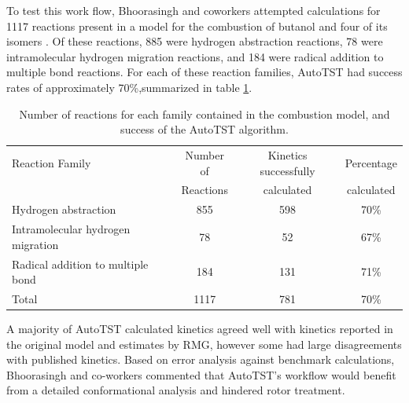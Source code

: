 \documentclass[preprint, 11pt]{elsarticle} %
\begin{document}
To test this work flow, Bhoorasingh and coworkers attempted calculations for 1117 reactions present in a model for the combustion of butanol and four of its isomers \cite{Sarathy:2012}.
Of these reactions, 885 were hydrogen abstraction reactions, 78 were intramolecular hydrogen migration reactions, and 184 were radical addition to multiple bond reactions. 
For each of these reaction families, AutoTST had success rates of approximately 70\%,summarized in table \ref{table:ModelRxns}.

\begin{table}[h!]
\label{t:atst_r}
\small
\caption{\label{table:ModelRxns} Number of reactions for each family contained in the combustion model, and success of the AutoTST algorithm.}
\centering
\begin{tabular*}{\linewidth}{@{\extracolsep{\fill}}lccc}
\hline\rule{0pt}{2.6ex}%
Reaction Family & Number of  & Kinetics successfully & Percentage \\
  & Reactions  & calculated & calculated\\
\hline\rule{0pt}{2.6ex}%
Hydrogen abstraction & 855 & 598 & 70\% \\
Intramolecular hydrogen migration & 78 & 52 & 67\% \\
Radical addition to multiple bond & 184 & 131 & 71\% \\
\hline\rule{0pt}{2.6ex}%
Total & 1117 & 781 & 70\%\\
\hline
\end{tabular*}
\end{table}

A majority of AutoTST calculated kinetics agreed well with kinetics reported in the original model and estimates by RMG, however some had large disagreements with published kinetics. 
Based on error analysis against benchmark calculations, Bhoorasingh and co-workers commented that AutoTST's workflow would benefit from a detailed conformational analysis and hindered rotor treatment. 

\end{document}
